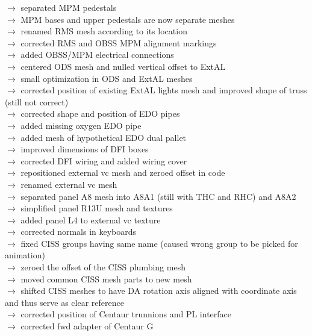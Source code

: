 \documentclass[Space_Shuttle_Vessel_Manual.tex]{subfiles}
\begin{document}
$\rightarrow$ separated MPM pedestals\\
$\rightarrow$ MPM bases and upper pedestals are now separate meshes\\
$\rightarrow$ renamed RMS mesh according to its location\\
$\rightarrow$ corrected RMS and OBSS MPM alignment markings\\
$\rightarrow$ added OBSS/MPM electrical connections\\
$\rightarrow$ centered ODS mesh and nulled vertical offset to ExtAL\\
$\rightarrow$ small optimization in ODS and ExtAL meshes\\
$\rightarrow$ corrected position of existing ExtAL lights mesh and improved shape of truss (still not correct)\\
$\rightarrow$ corrected shape and position of EDO pipes\\
$\rightarrow$ added missing oxygen EDO pipe\\
$\rightarrow$ added mesh of hypothetical EDO dual pallet\\
$\rightarrow$ improved dimensions of DFI boxes\\
$\rightarrow$ corrected DFI wiring and added wiring cover\\
$\rightarrow$ repositioned external vc mesh and zeroed offset in code\\
$\rightarrow$ renamed external vc mesh\\
$\rightarrow$ separated panel A8 mesh into A8A1 (still with THC and RHC) and A8A2\\
$\rightarrow$ simplified panel R13U mesh and textures\\
$\rightarrow$ added panel L4 to external vc texture\\
$\rightarrow$ corrected normals in keyboards\\
$\rightarrow$ fixed CISS groups having same name (caused wrong group to be picked for animation)\\
$\rightarrow$ zeroed the offset of the CISS plumbing mesh\\
$\rightarrow$ moved common CISS mesh parts to new mesh\\
$\rightarrow$ shifted CISS meshes to have DA rotation axis aligned with coordinate axis and thus serve as clear reference\\
$\rightarrow$ corrected position of Centaur trunnions and PL interface\\
$\rightarrow$ corrected fwd adapter of Centaur G\\
\end{document}
